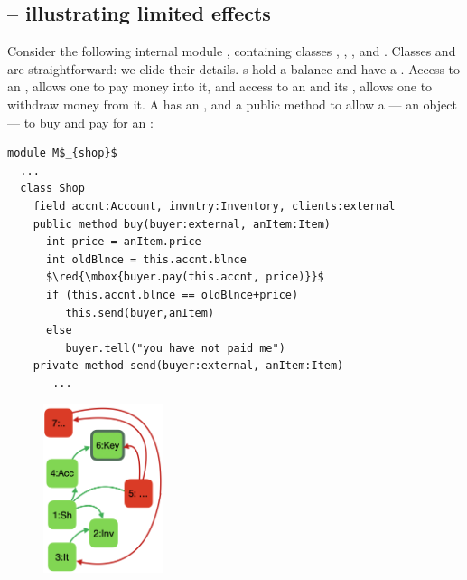  

\subsection*{ -- illustrating limited effects}  
\label{sec:how}
\label{sec:shop}

Consider the following internal module \Mshop, %
containing classes , , , and . 
Classes  and  are straightforward: we elide
their details. 
s hold a balance and have a \password. 
Access to an ,  allows one  to pay money into it, 
and  access to an   and its , allows one to withdraw money from it.
A  has an ,
and a public method  to allow a 
 --- an    object --- to buy
and pay for an :
 


\begin{lstlisting}[mathescape=true, language=Chainmail, frame=lines]
module M$_{shop}$
  ...   
  class Shop
    field accnt:Account, invntry:Inventory, clients:external      
    public method buy(buyer:external, anItem:Item)
      int price = anItem.price
      int oldBlnce = this.accnt.blnce
      $\red{\mbox{buyer.pay(this.accnt, price)}}$      
      if (this.accnt.blnce == oldBlnce+price)  
         this.send(buyer,anItem)
      else
         buyer.tell("you have not paid me")      
    private method send(buyer:external, anItem:Item)  
       ...         
\end{lstlisting}
 
 
 
\begin{figure}%
\includegraphics[width=35mm]{diagrams/ShopAtrimmed.png}
\end{figure}



